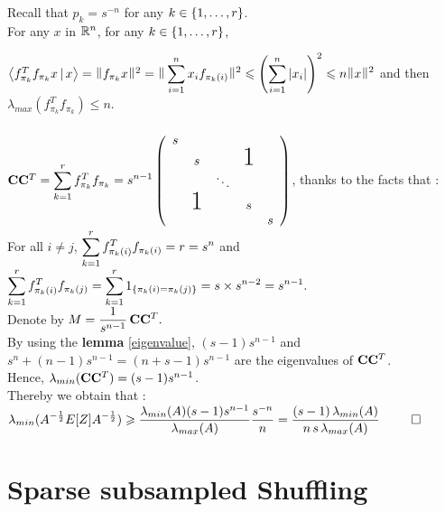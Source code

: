Recall that $p_{k} = s^{-n}$ for any $k\in \left\{1,\dots,r\right\}$.\\

For any $x$ in ${\mathbb R}^{n}$, for any $k\in \left\{1,\dots,r\right\}$,

$\scal{f_{\pi_{k}}^{T} f_{\pi_{k}} x }{x} = \norm{ f_{\pi_{k}}x }^{2} = \norm{\dsp\sum_{i=1}^{n} x_{i}f_{\pi_{k}(i)} }^{2} \leq \pare{\dsp\sum_{i=1}^{n} \abs{x_{i}}}^{2} \leq n\norm{x}^{2}$
 and then $\lambda_{max}( f_{\pi_{k}}^{T} f_{\pi_{k}}  ) \leq n$.\\\\
 
 
 
$\bold{C} \bold{C}^{T}= \dsp\sum\limits_{k=1}^{r} f_{\pi_{k}}^{T} f_{\pi_{k}} = s^{n-1}
    \left(
    \begin{array}{ccccc}
    s                                    \\
      & s             &   & \text{\huge1}\\
      &               & \ddots               \\
      & \text{\huge1} &   & s            \\
      &               &   &   & s
    \end{array}
    \right)$, thanks to the facts that :\\ For all $i\neq j$, $\displaystyle\sum\limits_{k=1}^{r} f_{\pi_{k}(i)}^{T} f_{\pi_{k}(i)} = r = s^{n}$ and $\displaystyle\sum\limits_{k=1}^{r} f_{\pi_{k}(i)}^{T} f_{\pi_{k}(j)} = \displaystyle\sum\limits_{k=1}^{r} 1_{\left\{\pi_{k}(i) = \pi_{k}(j)\right\}} = s \times s^{n-2} = s^{n-1}.$\\
Denote by $\displaystyle M = \frac{1}{s^{n-1}}\, \bold{C} \bold{C}^{T}.$\\

By using the \textbf{lemma} \ref{eigenvalue}, $(s-1)s^{n-1}$ and $s^{n} + (n-1)s^{n-1} = (n+s-1)s^{n-1}$ are the eigenvalues of $\bold{C} \bold{C}^{T}$.\\
Hence, $\lambda_{min}(\bold{C} \bold{C}^{T}) = (s-1)s^{n-1}$.\\

Thereby we obtain that :\\ 


$\displaystyle \lambda_{min}(A^{-\frac12}E[Z]A^{-\frac12} )  \geqslant  \frac{\lambda_{min}(A) (s-1)s^{n-1}}{ \lambda_{max}(A)}  \frac{s^{-n}}{n} =  \frac{(s-1)\,\lambda_{min}(A)}{n \, s \,\lambda_{max}(A)} $ $\qed$


\section{Sparse subsampled Shuffling}

